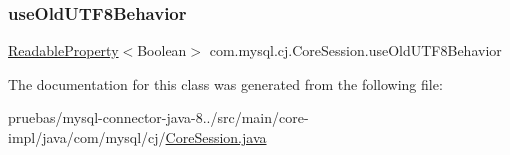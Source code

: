 \subsubsection{\texorpdfstring{use\+Old\+U\+T\+F8\+Behavior}{useOldUTF8Behavior}}
{\footnotesize\ttfamily \mbox{\hyperlink{interfacecom_1_1mysql_1_1cj_1_1conf_1_1_readable_property}{Readable\+Property}}$<$Boolean$>$ com.\+mysql.\+cj.\+Core\+Session.\+use\+Old\+U\+T\+F8\+Behavior\hspace{0.3cm}{\ttfamily [protected]}}



The documentation for this class was generated from the following file\+:\begin{DoxyCompactItemize}
\item 
pruebas/mysql-\/connector-\/java-\/8../src/main/core-\/impl/java/com/mysql/cj/\mbox{\hyperlink{_core_session_8java}{Core\+Session.\+java}}\end{DoxyCompactItemize}
